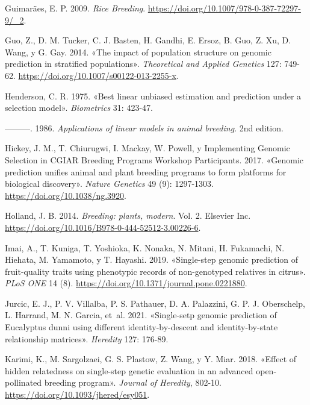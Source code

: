 \documentclass[11pt,spanish,a4paper,oneside,]{book} %
\begin{document}
\leavevmode\hypertarget{ref-cite:62}{}%
Guimarães, E. P. 2009. \emph{Rice Breeding}. \url{https://doi.org/10.1007/978-0-387-72297-9/_2}.

\leavevmode\hypertarget{ref-cite:70}{}%
Guo, Z., D. M. Tucker, C. J. Basten, H. Gandhi, E. Ersoz, B. Guo, Z. Xu, D. Wang, y G. Gay. 2014. «The impact of population structure on genomic prediction in stratified populations». \emph{Theoretical and Applied Genetics} 127: 749-62. \url{https://doi.org/10.1007/s00122-013-2255-x}.

\leavevmode\hypertarget{ref-cite:41}{}%
Henderson, C. R. 1975. «Best linear unbiased estimation and prediction under a selection model». \emph{Biometrics} 31: 423-47.

\leavevmode\hypertarget{ref-cite:67}{}%
---------. 1986. \emph{Applications of linear models in animal breeding}. 2nd edition.

\leavevmode\hypertarget{ref-cite:44}{}%
Hickey, J. M., T. Chiurugwi, I. Mackay, W. Powell, y Implementing Genomic Selection in CGIAR Breeding Programs Workshop Participants. 2017. «Genomic prediction unifies animal and plant breeding programs to form platforms for biological discovery». \emph{Nature Genetics} 49 (9): 1297-1303. \url{https://doi.org/10.1038/ng.3920}.

\leavevmode\hypertarget{ref-cite:43}{}%
Holland, J. B. 2014. \emph{Breeding: plants, modern}. Vol. 2. Elsevier Inc. \url{https://doi.org/10.1016/B978-0-444-52512-3.00226-6}.

\leavevmode\hypertarget{ref-cite:20}{}%
Imai, A., T. Kuniga, T. Yoshioka, K. Nonaka, N. Mitani, H. Fukamachi, N. Hiehata, M. Yamamoto, y T. Hayashi. 2019. «Single-step genomic prediction of fruit-quality traits using phenotypic records of non-genotyped relatives in citrus». \emph{PLoS ONE} 14 (8). \url{https://doi.org/10.1371/journal.pone.0221880}.

\leavevmode\hypertarget{ref-cite:11}{}%
Jurcic, E. J., P. V. Villalba, P. S. Pathauer, D. A. Palazzini, G. P. J. Oberschelp, L. Harrand, M. N. Garcia, et~al. 2021. «Single-setp genomic prediction of Eucalyptus dunni using different identity-by-descent and identity-by-state relationship matrices». \emph{Heredity} 127: 176-89.

\leavevmode\hypertarget{ref-cite:76}{}%
Karimi, K., M. Sargolzaei, G. S. Plastow, Z. Wang, y Y. Miar. 2018. «Effect of hidden relatedness on single-step genetic evaluation in an advanced open-pollinated breeding program». \emph{Journal of Heredity}, 802-10. \url{https://doi.org/10.1093/jhered/esy051}.
\end{document}
